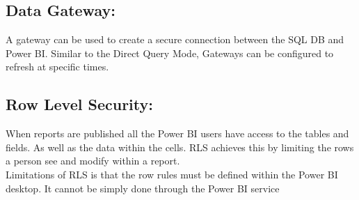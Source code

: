 \documentclass[a5paper]{article}
\begin{document}
	\subsection{Data Gateway:}
	A gateway can be used to create a secure connection between the SQL DB and Power BI. Similar to the Direct Query Mode, Gateways can be configured to refresh at specific times.
	\subsection{Row Level Security:}
	When reports are published all the Power BI users have access to the tables and fields. As well as the data within the cells. RLS achieves this by limiting the rows a person see and modify within a report.\\
	Limitations of RLS is that the row rules must be defined within the Power BI desktop. It cannot be simply done through the Power BI service
\end{document}
